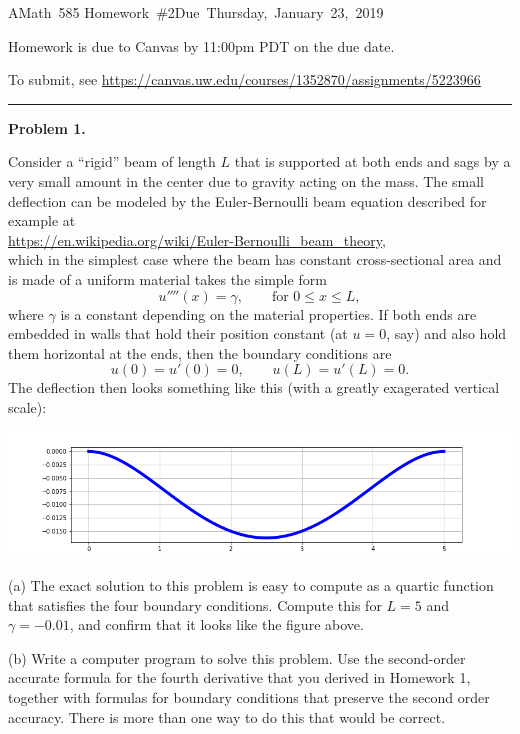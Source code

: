 \documentclass[10pt]{article}
\begin{document}
\hfill\vbox{\hbox{AMath 585}
\hbox{Homework \#2}\hbox{Due Thursday, January 23, 2019}}

\vskip 5pt

Homework is due to Canvas by 11:00pm PDT on the due date.

To submit, see
\url{https://canvas.uw.edu/courses/1352870/assignments/5223966}



\vskip 1cm
\hrule
{\bf Problem 1.}

Consider a ``rigid'' beam of length $L$
that is supported at both ends and sags by a very
small amount in the center due to gravity acting on the mass.  The small
deflection can be modeled by the Euler-Bernoulli 
beam equation described for example at\\
\url{https://en.wikipedia.org/wiki/Euler-Bernoulli\_beam\_theory}, \\
which in the simplest case where the beam has constant
cross-sectional area and is made of a uniform material takes the simple form
\[
u''''(x) = \gamma, \qquad \text{for~} 0\leq x \leq L,
\]
where $\gamma$ is a constant depending on the material properties.   
If both ends are embedded in walls that hold their position constant 
(at $u=0$, say) and also hold them horizontal at the ends, then the boundary
conditions are
\[
u(0) = u'(0) = 0, \qquad u(L) = u'(L) = 0.
\]
The deflection then looks something like this (with a greatly exagerated
vertical scale):

\hfil\includegraphics[width=6.0in]{beam.png}\hfil

(a) The exact solution to this problem is easy to compute as a quartic
function that satisfies the four boundary conditions.  Compute this for
$L=5$ and $\gamma = -0.01$, and confirm that it looks like the figure above.

(b) Write a computer program to solve this problem.  Use the second-order
accurate formula for the fourth derivative that you derived in Homework 1,
together with formulas for boundary conditions that preserve the second
order accuracy.  There is more than one way to do this that would be correct.
\end{document}
